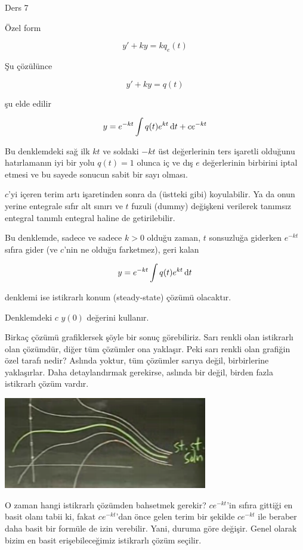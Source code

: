 \documentclass[12pt,fleqn]{article}\usepackage{../../common}
\begin{document}
Ders 7

Özel form

$$ y' + ky = kq_e(t) $$

Şu çözülünce

$$ y'+ky = q(t) $$

şu elde edilir

$$ y = e^{-kt} \int q(t) e^{kt} \,\mathrm{d} t + ce^{-kt}$$

Bu denklemdeki sağ ilk $kt$ ve soldaki $-kt$ üst değerlerinin ters işaretli
olduğunu hatırlamanın iyi bir yolu $q(t) = 1$ olunca iç ve dış $e$
değerlerinin birbirini iptal etmesi ve bu sayede sonucun sabit bir sayı
olması.

$c$'yi içeren terim artı işaretinden sonra da (üstteki gibi)
koyulabilir. Ya da onun yerine entegrale sıfır alt sınırı ve $t$ fuzuli
(dummy) değişkeni verilerek tanımsız entegral tanımlı entegral haline de
getirilebilir. 

Bu denklemde, sadece ve sadece $k>0$ olduğu zaman, $t$ sonsuzluğa giderken
$e^{-kt}$ sıfıra gider (ve $c$'nin ne olduğu farketmez), geri kalan

$$ y = e^{-kt} \int q(t) e^{kt} \,\mathrm{d} t  $$

denklemi ise istikrarlı konum (steady-state) çözümü olacaktır. 

Denklemdeki $c$ $y(0)$ değerini kullanır. 

Birkaç çözümü grafiklersek şöyle bir sonuç görebiliriz. Sarı renkli olan
istikrarlı olan çözümdür, diğer tüm çözümler ona yaklaşır. Peki sarı renkli
olan grafiğin özel tarafı nedir? Aslında yoktur, tüm çözümler sarıya değil,
birbirlerine yaklaşırlar. Daha detaylandırmak gerekirse, aslında bir değil,
birden fazla istikrarlı çözüm vardır. 

\includegraphics[height=4cm]{7_1.png}

O zaman hangi istikrarlı çözümden bahsetmek gerekir?  $ce^{-kt}$'in sıfıra
gittiği en basit olanı tabii ki, fakat $ce^{-kt}$'dan önce gelen terim bir
şekilde $ce^{-kt}$ ile beraber daha basit bir formüle de izin verebilir. Yani,
duruma göre değişir. Genel olarak bizim en basit erişebileceğimiz istikrarlı
çözüm seçilir.
\end{document}
